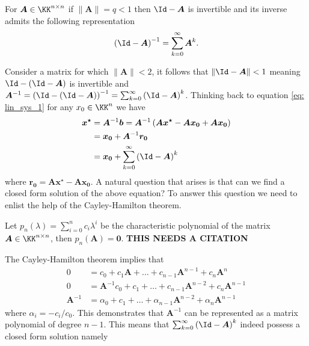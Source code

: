 \begin{thm} \label{theorem: invert_mat_norm}
    For $\bm{A} \in \KK^{n \times n}$ if $\| \bm{A} \| = q < 1$ then $\Id - \bm{A}$ is invertible and its inverse admits the following representation
    \[
        \left( \Id - \bm{A} \right)^{-1} = \sum_{k=0}^{\infty} \bm{A}^k.
    \]
    \cite{BerezanskyMakarovich1996FaV1}
\end{thm}
Consider a matrix for which $\| \bm{A} \| < 2$, it follows that $\| \Id - \bm{A} \| < 1$ meaning $\Id - \left( \Id - \bm{A} \right)$ is invertible and $\bm{A}^{-1} = \left( \Id - \left( \Id - \bm{A} \right) \right)^{-1} = \sum_{k=0}^{\infty} \left( \Id - \bm{A} \right)^{k}$. Thinking back to equation \ref{eq: lin_sys_1} for any $x_0 \in \KK^{n}$ we have
\begin{align*}
    \bm{x^{\star}} & = \bm{A}^{-1} \bm{b} = \bm{A}^{-1} \left( \bm{A} \bm{x^{\star}} - \bm{A} \bm{x_0} + \bm{A} \bm{x_0} \right) \\
                   & = \bm{x_0} + \bm{A}^{-1} \bm{r_0}                                                                           \\
                   & = \bm{x_0} + \sum_{k=0}^{\infty} \left( \Id - \bm{A} \right)^k
\end{align*}
where $\bm{r_0} = \bm{A} \bm{x^{\star}} - \bm{A} \bm{x_0}$. A natural question that arises is that can we find a closed form solution of the above equation? To answer this question we need to enlist the help of the Cayley-Hamilton theorem.
\begin{thm} \label{theorem: cayley_amilton}
    Let $p_n \left( \lambda \right) = \sum_{i=0}^{n} c_i \lambda^{i}$ be the characteristic polynomial of the matrix $\bm{A} \in \KK^{n \times n}$, then $p_n \left( \bm{A} \right) = \bm{0}$. {\color{red} \textbf{THIS NEEDS A CITATION}}
\end{thm}
The Cayley-Hamilton theorem implies that
\begin{align*}
    0           & = c_0 + c_1 \bm{A} + \ldots + c_{n-1} \bm{A}^{n-1} + c_{n} \bm{A}^{n}           \\
    0           & = \bm{A}^{-1} c_0 + c_1 + \ldots + c_{n-1} \bm{A}^{n-2} + c_{n} \bm{A}^{n-1}    \\
    \bm{A}^{-1} & = \alpha_0 + c_1 + \ldots + \alpha_{n-1} \bm{A}^{n-2} + \alpha_{n} \bm{A}^{n-1}
\end{align*}
where $\alpha_i = -c_i / c_0$. This demonstrates that $\bm{A}^{-1}$ can be represented as a matrix polynomial of degree $n-1$. This means that $\sum_{k=0}^{\infty} \left( \Id - \bm{A} \right)^k$ indeed possess a closed form solution namely
